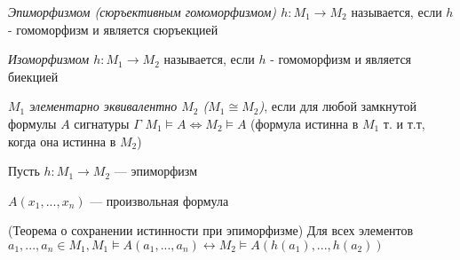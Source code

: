 \documentclass{article}
\begin{document}
\begin{definition}
	\textit{Эпиморфизмом (сюръективным гомоморфизмом) $h: M_1 \rightarrow M_2$} называется, если $h$ - гомоморфизм и является сюръекцией
\end{definition}

\begin{definition}
	\textit{Изоморфизмом $h: M_1 \rightarrow M_2$} называется, если $h$ - гомоморфизм и является биекцией
\end{definition}

\begin{definition}
	\textit{$M_1$ элементарно эквивалентно $M_2$ ($M_1 \cong M_2$)}, если для любой замкнутой формулы $A$ сигнатуры $\Gamma$ $M_1 \vDash A \Leftrightarrow M_2 \vDash A$ (формула истинна в $M_1$ т. и т.т, когда она истинна в $M_2$)
\end{definition}

Пусть $h: M_1 \rightarrow M_2$ --- эпиморфизм

$A(x_1,..., x_n)$ --- произвольная формула
\begin{theorem}{(Теорема о сохранении истинности при эпиморфизме)}
	Для всех элементов $a_1,..., a_n \in M_1, M_1 \vDash A(a_1,..., a_n) \leftrightarrow M_2 \vDash A(h(a_1),..., h(a_2))$
\end{theorem}
\end{document}
